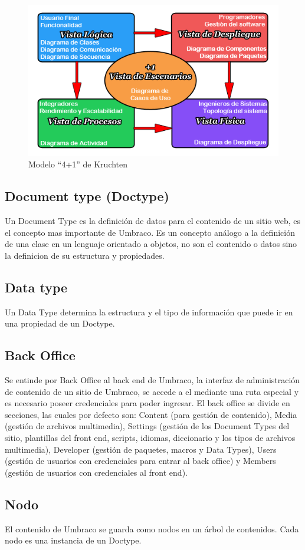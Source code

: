 \begin{figure}[H]
    \begin{center}
    \includegraphics[width=\textwidth]{vistas.png}
    \caption{Modelo “4+1” de Kruchten}
    \label{fig:vistas}
    \end{center}
\end{figure}

\subsection{Document type (Doctype)}
Un Document Type es la definición de datos para el contenido de un sitio web, es el concepto mas importante de Umbraco. Es un concepto análogo a la definición de una clase en un lenguaje orientado a objetos, no son el contenido o datos sino la definicion de su estructura y propiedades. 
\subsection{Data type}
Un Data Type determina la estructura y el tipo de información que puede ir en una propiedad de un Doctype.
\subsection{Back Office}
Se entinde por Back Office al back end de Umbraco, la interfaz de administración de contenido de un sitio de Umbraco, se accede a el mediante una ruta especial y es necesario poseer credenciales para poder ingresar. El back office se divide en secciones, las cuales por defecto son: Content (para gestión de contenido), Media (gestión de archivos multimedia), Settings (gestión de los Document Types del sitio, plantillas del front end, scripts, idiomas, diccionario y los tipos de archivos multimedia), Developer (gestión de paquetes, macros y Data Types), Users (gestión de usuarios con credenciales para entrar al back office) y Members (gestión de usuarios con credenciales al front end).
\subsection{Nodo} \label{nodoUmbraco}
El contenido de Umbraco se guarda como nodos en un árbol de contenidos. Cada nodo es una instancia de un Doctype.
